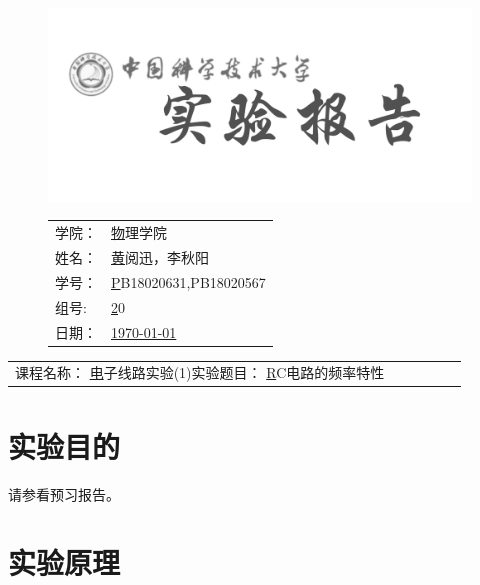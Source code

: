 \documentclass[a4paper,11pt,UTF8]{ctexart}
\newcommand{\major}{物理学院}
\newcommand{\name}{黄阅迅，李秋阳}
\newcommand{\stuid}{PB18020631,PB18020567}
\newcommand{\group}{20}
\newcommand{\newdate}{\today}
\newcommand{\course}{电子线路实验(1)}
\newcommand{\newtitle}{RC电路的频率特性}
\begin{document}
\thispagestyle{empty}
\begin{figure}[h]
  \begin{minipage}{0.6\linewidth}
    \centerline{\includegraphics[width=\linewidth]{logo.png}}
  \end{minipage}
  \hfill
  \begin{minipage}{.4\linewidth}
    \raggedleft
    \begin{tabular*}{.8\linewidth}{ll}
      学院： & \underline\major   \\
      姓名： & \underline\name    \\
      学号： & \underline\stuid   \\
      组号:  & \underline\group   \\
      日期： & \underline\newdate \\
    \end{tabular*}
  \end{minipage}
\end{figure}

\begin{table}[!htbp]
  \centering
  \begin{tabular*}{\linewidth}{llllll}
    课程名称：  \underline\course   \qquad\qquad 实验题目：  \underline\newtitle  
  \end{tabular*}
\end{table}


\section{实验目的}

请参看预习报告。

\section{实验原理}
\end{document}
